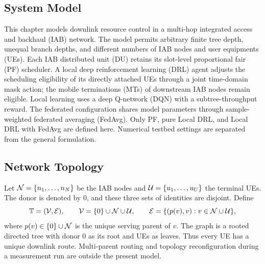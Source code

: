 \begin{EnChapter}

\chapter{System Model}
\label{chap:system-model}

This chapter models downlink resource control in a multi-hop integrated access
and backhaul (IAB) network. The model permits arbitrary finite tree depth, unequal
branch depths, and different numbers of IAB nodes and user equipments (UEs).
Each IAB distributed unit (DU) retains its slot-level proportional fair (PF)
scheduler. A local deep reinforcement learning (DRL) agent adjusts the scheduling
eligibility of its directly attached UEs through a joint time-domain mask action;
the mobile terminations (MTs) of downstream IAB nodes remain eligible. Local
learning uses a deep Q-network (DQN) with a subtree-throughput reward. The
federated configuration shares model parameters through sample-weighted federated
averaging (FedAvg). Only PF, pure Local DRL, and Local DRL with FedAvg are defined
here. Numerical testbed settings are separated from the general formulation.

\section{Network Topology}
\label{subsec:topology}

Let $\mathcal{N}=\{n_1,\ldots,n_N\}$ be the IAB nodes and
$\mathcal{U}=\{u_1,\ldots,u_U\}$ the terminal UEs. The donor is denoted by $0$, and
these three sets of identities are disjoint. Define
\begin{equation}
  \mathbb{T}=(\mathcal{V},\mathcal{E}),\qquad
  \mathcal{V}=\{0\}\cup\mathcal{N}\cup\mathcal{U},\qquad
  \mathcal{E}=\{(p(v),v):v\in\mathcal{N}\cup\mathcal{U}\},
\end{equation}
where $p(v)\in\{0\}\cup\mathcal{N}$ is the unique serving parent of $v$.
The graph is a rooted directed tree with donor $0$ as its root and UEs as leaves.
Thus every UE has a unique downlink route. Multi-parent routing and topology
reconfiguration during a measurement run are outside the present model.


\end{EnChapter}
